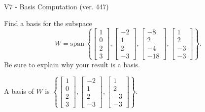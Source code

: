 \begin{exercise}
  \begin{exerciseTitle}V7 - Basis Computation (ver. 447)\end{exerciseTitle}
  \begin{exerciseStatement}
    Find a basis for the subspace 
\[W=\mathrm{span}\ \left\{\left[\begin{array}{r}
1 \\
0 \\
2 \\
3
\end{array}\right] , \left[\begin{array}{r}
-2 \\
1 \\
2 \\
-3
\end{array}\right] , \left[\begin{array}{r}
-8 \\
2 \\
-4 \\
-18
\end{array}\right] , \left[\begin{array}{r}
1 \\
2 \\
-3 \\
-3
\end{array}\right]\right\}.\]
 Be sure to explain why your result is a basis.


  \end{exerciseStatement}
  \begin{exerciseAnswer}
   A basis of \(W\) is  \(\left\{\left[\begin{array}{r}
1 \\
0 \\
2 \\
3
\end{array}\right] , \left[\begin{array}{r}
-2 \\
1 \\
2 \\
-3
\end{array}\right] , \left[\begin{array}{r}
1 \\
2 \\
-3 \\
-3
\end{array}\right]\right\}\).
  


  \end{exerciseAnswer}
\end{exercise}